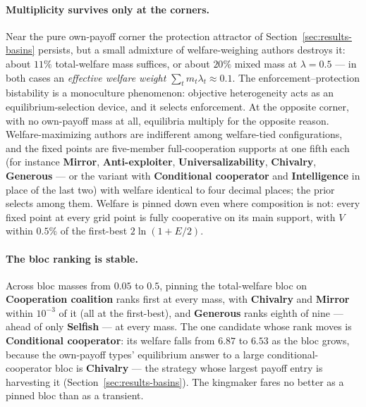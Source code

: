 \paragraph{Multiplicity survives only at the corners.}
Near the pure own-payoff corner the protection attractor of
Section~\ref{sec:results-basins} persists, but a small admixture of
welfare-weighing authors destroys it: about $11\%$ total-welfare
mass suffices, or about $20\%$ mixed mass at $\lambda = 0.5$ ---
in both cases an \emph{effective welfare weight}
$\sum_t m_t \lambda_t \approx 0.1$.
The enforcement--protection bistability is a monoculture
phenomenon: objective heterogeneity acts as an equilibrium-selection
device, and it selects enforcement.
At the opposite corner, with no own-payoff mass at all, equilibria
multiply for the opposite reason.
Welfare-maximizing authors are indifferent among welfare-tied
configurations, and the fixed points are five-member full-cooperation
supports at one fifth each (for instance \textbf{Mirror},
\textbf{Anti-exploiter}, \textbf{Universalizability},
\textbf{Chivalry}, \textbf{Generous} --- or the variant with
\textbf{Conditional cooperator} and \textbf{Intelligence} in place
of the last two) with welfare identical to four decimal places; the
prior selects among them.
Welfare is pinned down even where composition is not: every fixed
point at every grid point is fully cooperative on its main support,
with $V$ within $0.5\%$ of the first-best $2\ln(1 + E/2)$.

\paragraph{The bloc ranking is stable.}
Across bloc masses from $0.05$ to $0.5$, pinning the total-welfare
bloc on \textbf{Cooperation coalition} ranks first at every mass,
with \textbf{Chivalry} and \textbf{Mirror} within $10^{-3}$ of it
(all at the first-best), and \textbf{Generous} ranks eighth of nine
--- ahead of only \textbf{Selfish} --- at every mass.
The one candidate whose rank moves is \textbf{Conditional
cooperator}: its welfare falls from $6.87$ to $6.53$ as the bloc
grows, because the own-payoff types' equilibrium answer to a large
conditional-cooperator bloc is \textbf{Chivalry} --- the strategy
whose largest payoff entry is harvesting it
(Section~\ref{sec:results-basins}).
The kingmaker fares no better as a pinned bloc than as a transient.
